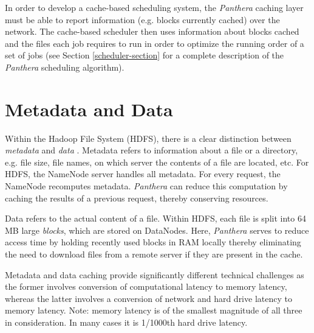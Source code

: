 \documentclass[12pt]{article}
\begin{document}
In order to develop a cache-based scheduling system, the \textit{Panthera} caching layer must be able to report information (e.g. blocks currently cached) over the network. The cache-based scheduler then uses information about blocks cached and the files each job requires to run in order to optimize the running order of a set of jobs (see Section \ref{scheduler-section} for a complete description of the \textit{Panthera} scheduling algorithm).

\section{Metadata and Data}

Within the Hadoop File System (HDFS), there is a clear distinction between \textit{metadata} and \textit{data} \cite{hdfs}. Metadata refers to information about a file or a directory, e.g. file size, file names, on which server the contents of a file are located, etc. For HDFS, the NameNode server handles all metadata. For every request, the NameNode recomputes metadata. \textit{Panthera} can reduce this computation by caching the results of a previous request, thereby conserving resources.

Data refers to the actual content of a file. Within HDFS, each file is split into 64 MB large \textit{blocks}, which are stored on DataNodes. Here, \textit{Panthera} serves to reduce access time by holding recently used blocks in RAM locally thereby eliminating the need to download files from a remote server if they are present in the cache.

Metadata and data caching provide significantly different technical challenges as the former involves conversion of computational latency to memory latency, whereas the latter involves a conversion of network and hard drive latency to memory latency. Note: memory latency is of the smallest magnitude of all three in consideration. In many cases \cite{ramcloud} it is 1/1000th hard drive latency.
\end{document}
